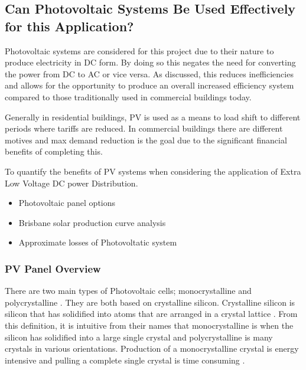 \subsection{Can Photovoltaic Systems Be Used Effectively for this 
	\newline
	Application?} \label{section:question2}

Photovoltaic systems are considered for this project due to their nature to produce electricity in DC form. By doing so this negates the need for converting the power from DC to AC or vice versa. As discussed, this reduces inefficiencies and allows for the opportunity to produce an overall increased efficiency system compared to those traditionally used in commercial buildings today. 
\newline

Generally in residential buildings, PV is used as a means to load shift to different periods where tariffs are reduced. In commercial buildings there are different motives and max demand reduction is the goal due to the significant financial benefits of completing this.
\newline

To quantify the benefits of PV systems when considering the application of Extra Low Voltage DC power Distribution.

\begin{itemize}[noitemsep,nolistsep]
\item Photovoltaic panel options
\item Brisbane solar production curve analysis
\item Approximate losses of Photovoltatic system
\end{itemize}

\subsubsection{PV Panel Overview} \label{section:PV-panels}

There are two main types of Photovoltaic cells; monocrystalline and polycrystalline \cite{Haberlin2012}. They are both based on crystalline silicon. Crystalline silicon is silicon that has solidified into atoms that are arranged in a crystal lattice \cite{Haberlin2012}. From this definition, it is intuitive from their names that monocrystalline is when the silicon has solidified into a large single crystal and polycrystalline is many crystals in various orientations. Production of a monocrystalline crystal is energy intensive and pulling a complete single crystal is time consuming \cite{Haberlin2012}.      
\newline 


